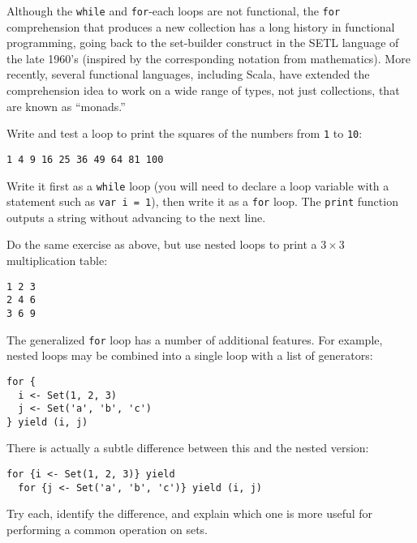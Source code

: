 \begin{tailquote}
Although the \verb|while| and \verb|for|-each loops are not functional, the \verb|for| comprehension that produces a new collection has a long history in functional programming, going back to the set-builder construct in the SETL language of the late 1960's (inspired by the corresponding notation from mathematics). More recently, several functional languages, including Scala, have extended the comprehension idea to work on a wide range of types, not just collections, that are known as ``monads.''
\end{tailquote}
\begin{exercises}
\item Write and test a loop to print the squares of the numbers from \texttt{1} to \texttt{10}:
\begin{center}
\texttt{1 4 9 16 25 36 49 64 81 100}
\end{center}
Write it first as a \texttt{while} loop (you will need to declare a loop variable with a statement such as \verb|var i = 1|), then write it as a \texttt{for} loop. The \texttt{print} function outputs a string without advancing to the next line.

\item Do the same exercise as above, but use nested loops to print a $3\times 3$ multiplication table:
\begin{center}
\texttt{1 2 3}\\
\texttt{2 4 6}\\
\texttt{3 6 9}
\end{center}

\item The generalized \texttt{for} loop has a number of additional features. For example, nested loops may be combined into a single loop with a list of generators:
\begin{verbatim}
for {
  i <- Set(1, 2, 3)
  j <- Set('a', 'b', 'c')
} yield (i, j)
\end{verbatim}
There is actually a subtle difference between this and the nested version:
\begin{verbatim}
for {i <- Set(1, 2, 3)} yield
  for {j <- Set('a', 'b', 'c')} yield (i, j)
\end{verbatim}
Try each, identify the difference, and explain which one is more useful for performing a common operation on sets.
\end{exercises}

